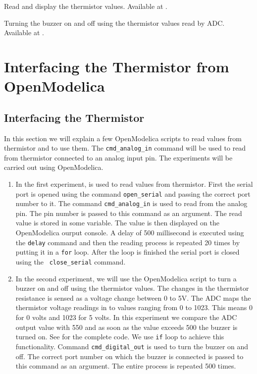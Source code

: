 \begin{juliacode}
 {Read and display
    the thermistor values.  Available at
  .}
\label{julia:therm-read}

\end{juliacode}

\begin{juliacode}
  {Turning the buzzer on and off using the thermistor values read by
    ADC.  Available at .}
\label{julia:therm-buzzer}

\end{juliacode}

\section{Interfacing the Thermistor from OpenModelica}
\subsection{Interfacing the Thermistor}
In this section we will explain a few OpenModelica scripts to read values
from thermistor and to use them.  The {\tt cmd\_analog\_in} command
will be used to read from thermistor connected to an analog input
pin. The experiments will be carried out using OpenModelica.

\begin{enumerate}
\item In the first experiment,  is used to read
  values from thermistor. First the serial port is opened using the
  command {\tt open\_serial} and passing the correct port number to
  it. The command {\tt cmd\_analog\_in} is used to read from the
  analog pin. The pin number is passed to this command as an
  argument. The read value is stored in some variable. The value is
  then displayed on the OpenModelica ourput console. A delay of 500 millisecond is
  executed using the {\tt delay} command and then the reading process
  is repeated 20 times by putting it in a {\tt for} loop. After the
  loop is finished the serial port is closed using the {\tt
    close\_serial} command.

\item In the second experiment, we will use the OpenModelica script to
  turn a buzzer on and off using the thermistor values. The changes in
  the thermistor resistance is sensed as a voltage change between 0 to
  5V. The ADC maps the thermistor voltage readings in to values
  ranging from 0 to 1023. This means 0 for 0 volts and 1023 for 5
  volts. In this experiment we compare the ADC output value with 550
  and as soon as the value exceeds 500 the buzzer is turned on. See
   for the complete code. We use {\tt if}
  loop to achieve this functionality. Command {\tt cmd\_digital\_out}
  is used to turn the buzzer on and off.  The correct port number on
  which the buzzer is connected is passed to this command as an
  argument. The entire process is repeated 500 times.
\end{enumerate}

